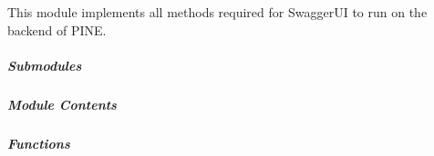 \documentclass[letterpaper,10pt,english]{sphinxmanual}
\begin{document}

\begin{fulllineitems}
\label{\detokenize{autoapi/pine/backend/annotations/bp/index:pine.backend.annotations.bp.init_app}}
\end{fulllineitems}



\subparagraph{}
\label{\detokenize{autoapi/pine/backend/api/index:module-pine.backend.api}}\label{\detokenize{autoapi/pine/backend/api/index:pine-backend-api}}\label{\detokenize{autoapi/pine/backend/api/index::doc}}
\sphinxAtStartPar
This module implements all methods required for SwaggerUI to run on the
backend of PINE.


\subparagraph{Submodules}
\label{\detokenize{autoapi/pine/backend/api/index:submodules}}

\subparagraph{}
\label{\detokenize{autoapi/pine/backend/api/bp/index:module-pine.backend.api.bp}}\label{\detokenize{autoapi/pine/backend/api/bp/index:pine-backend-api-bp}}\label{\detokenize{autoapi/pine/backend/api/bp/index::doc}}

\subparagraph{Module Contents}
\label{\detokenize{autoapi/pine/backend/api/bp/index:module-contents}}

\subparagraph{Functions}
\label{\detokenize{autoapi/pine/backend/api/bp/index:functions}}
\end{document}
